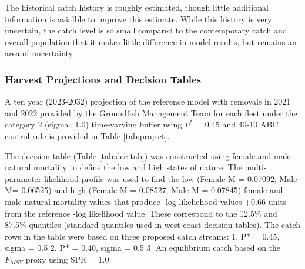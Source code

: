 \documentclass[11pt,
  english,
  a4paper,
]{article}
\begin{document}
\leavevmode\tagmcend\tagstructend\par


The historical catch history is roughly estimated, though little additional information is avialble to improve this estimate. While this history is very uncertain, the catch level is so small compared to the contemporary catch and overall population that it makes little difference in model results, but remains an area of uncertainty.

\leavevmode\tagmcend\tagstructend\par


\hypertarget{harvest-projections-and-decision-tables}{%
\subsubsection{Harvest Projections and Decision Tables}\label{harvest-projections-and-decision-tables}}

\leavevmode\tagmcend\tagstructend


A ten year (2023-2032) projection of the reference model with removals in 2021 and 2022 provided by the Groundfish Management Team for each fleet under the category 2 (sigma=1.0) time-varying buffer using {\(P^*\)\leavevmode\tagmcend\tagstructend} = 0.45 and 40-10 ABC control rule is provided in Table \ref{tab:project}.

\leavevmode\tagmcend\tagstructend\par


The decision table (Table \ref{tab:dec-tab}) was constructed using female and male natural mortality to define the low and high states of nature. The multi-parameter likelihood profile was used to find the low (Female M = 0.07092; Male M= 0.06525) and high (Female M = 0.08527; Male M = 0.07845) female and male natural mortality values that produce -log likeliehood values +0.66 units from the reference -log likelihood value. These correspond to the 12.5\% and 87.5\% quantiles (standard quantiles used in west coast decision tables). The catch rows in the table were based on three proposed catch streams: 1. P* = 0.45, sigma = 0.5 2. P* = 0.40, sigma = 0.5 3. An equilibrium catch based on the {\(F_{MSY}\)\leavevmode\tagmcend\tagstructend} proxy using SPR = 1.0
\end{document}
